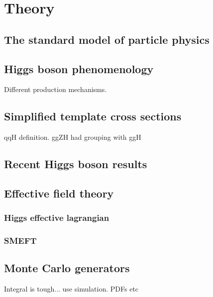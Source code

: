 \chapter{Theory}
\label{chap:theory}

\section{The standard model of particle physics}

\section{Higgs boson phenomenology}
Different production mechanisms.

\section{Simplified template cross sections}
qqH definition. ggZH had grouping with ggH

\section{Recent Higgs boson results}

\section{Effective field theory}
\subsection{Higgs effective lagrangian}

\subsection{SMEFT}

\section{Monte Carlo generators}
Integral is tough... use simulation. PDFs etc